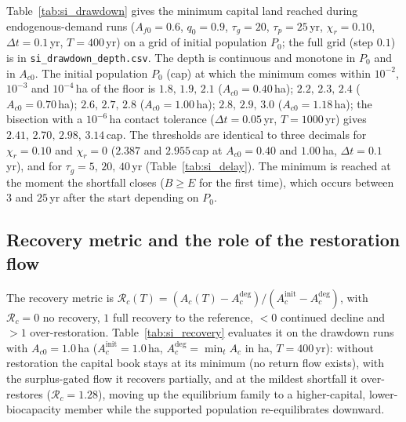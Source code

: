Table~\ref{tab:si_drawdown} gives the minimum capital land reached during endogenous-demand runs ($A_{f0}=0.6$, $q_0=0.9$, $\tau_g=20$, $\tau_p=25$\,yr, $\chi_r=0.10$, $\Delta t=0.1$\,yr, $T=400$\,yr) on a grid of initial population $P_0$; the full grid (step $0.1$) is in \texttt{si\_drawdown\_depth.csv}. The depth is continuous and monotone in $P_0$ and in $A_{c0}$. The initial population $P_0$ (cap) at which the minimum comes within $10^{-2}$, $10^{-3}$ and $10^{-4}$\,ha of the floor is $1.8,\,1.9,\,2.1$ ($A_{c0}=0.40$\,ha); $2.2,\,2.3,\,2.4$ ($A_{c0}=0.70$\,ha); $2.6,\,2.7,\,2.8$ ($A_{c0}=1.00$\,ha); $2.8,\,2.9,\,3.0$ ($A_{c0}=1.18$\,ha); the bisection with a $10^{-6}$\,ha contact tolerance ($\Delta t=0.05$\,yr, $T=1000$\,yr) gives $2.41,\,2.70,\,2.98,\,3.14$\,cap. The thresholds are identical to three decimals for $\chi_r=0.10$ and $\chi_r=0$ ($2.387$ and $2.955$\,cap at $A_{c0}=0.40$ and $1.00$\,ha, $\Delta t=0.1$\,yr), and for $\tau_g=5,\,20,\,40$\,yr (Table~\ref{tab:si_delay}). The minimum is reached at the moment the shortfall closes ($B\ge E$ for the first time), which occurs between $3$ and $25$\,yr after the start depending on $P_0$.

\begin{table}[htbp]
\centering\small
\caption{Minimum capital land $\min_tA_c$ (ha) reached during the run, by initial capital $A_{c0}$ (rows, ha) and initial population $P_0$ (columns, cap); typed floor $\Acmin=0.05$\,ha.}
\label{tab:si_drawdown}

\end{table}

\subsection{Recovery metric and the role of the restoration flow}\label{si:recovery}

The recovery metric is $\mathcal R_c(T)=(A_c(T)-A_c^{\mathrm{deg}})/(A_c^{\mathrm{init}}-A_c^{\mathrm{deg}})$, with $\mathcal R_c=0$ no recovery, $1$ full recovery to the reference, $<0$ continued decline and $>1$ over-restoration. Table~\ref{tab:si_recovery} evaluates it on the drawdown runs with $A_{c0}=1.0$\,ha ($A_c^{\mathrm{init}}=1.0$\,ha, $A_c^{\mathrm{deg}}=\min_tA_c$ in ha, $T=400$\,yr): without restoration the capital book stays at its minimum (no return flow exists), with the surplus-gated flow it recovers partially, and at the mildest shortfall it over-restores ($\mathcal R_c=1.28$), moving up the equilibrium family to a higher-capital, lower-biocapacity member while the supported population re-equilibrates downward.

